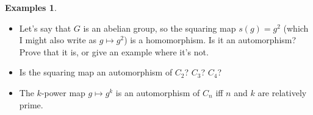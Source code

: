 \documentclass[12pt]{article}
\theoremstyle{definition} %
\newtheorem*{example}{Examples}
\newcommand{\Alert}[1]{\textcolor{xRed}{#1}}
\begin{document}
\begin{example}
\begin{itemize}
        \item Let's say that $G$ is an abelian group, so the squaring map $s(g) = g^2$ (which I might also write as $g\mapsto g^2$) is a homomorphism. Is it an automorphism? Prove that it is, or give an example where it's not.
        \item Is the squaring map an automorphism of $C_2$? $C_3$? $C_4$?
        \item The $k$-power map $g\mapsto g^k$ is an automorphism of $C_n$ \Alert{iff} $n$ and $k$ are relatively prime.
    \end{itemize}
\end{example}
\end{document}
